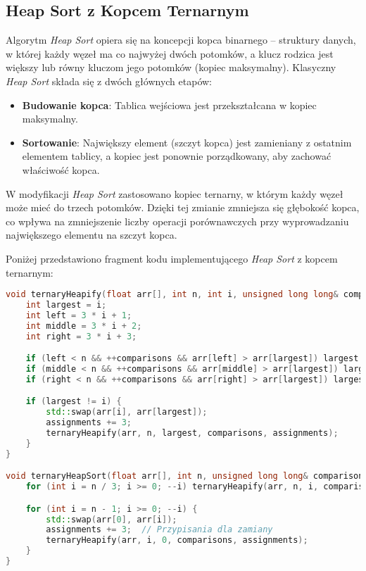\documentclass[a4paper,12pt]{article}
\begin{document}
\subsection{Heap Sort z Kopcem Ternarnym}
Algorytm \textit{Heap Sort} opiera się na koncepcji kopca binarnego – struktury danych, w której każdy węzeł ma co najwyżej dwóch potomków, a klucz rodzica jest większy lub równy kluczom jego potomków (kopiec maksymalny). Klasyczny \textit{Heap Sort} składa się z dwóch głównych etapów:
\begin{itemize}
    \item \textbf{Budowanie kopca}: Tablica wejściowa jest przekształcana w kopiec maksymalny.
    \item \textbf{Sortowanie}: Największy element (szczyt kopca) jest zamieniany z ostatnim elementem tablicy, a kopiec jest ponownie porządkowany, aby zachować właściwość kopca.
\end{itemize}

W modyfikacji \textit{Heap Sort} zastosowano kopiec ternarny, w którym każdy węzeł może mieć do trzech potomków. Dzięki tej zmianie zmniejsza się głębokość kopca, co wpływa na zmniejszenie liczby operacji porównawczych przy wyprowadzaniu największego elementu na szczyt kopca. 

\newpage
Poniżej przedstawiono fragment kodu implementującego \textit{Heap Sort} z kopcem ternarnym:

\begin{lstlisting}[language=C++,caption=Heap Sort z kopcem ternarnym]
void ternaryHeapify(float arr[], int n, int i, unsigned long long& comparisons, unsigned long long& assignments) {
    int largest = i;
    int left = 3 * i + 1;
    int middle = 3 * i + 2;
    int right = 3 * i + 3;

    if (left < n && ++comparisons && arr[left] > arr[largest]) largest = left;
    if (middle < n && ++comparisons && arr[middle] > arr[largest]) largest = middle;
    if (right < n && ++comparisons && arr[right] > arr[largest]) largest = right;

    if (largest != i) {
        std::swap(arr[i], arr[largest]);
        assignments += 3;
        ternaryHeapify(arr, n, largest, comparisons, assignments);
    }
}

void ternaryHeapSort(float arr[], int n, unsigned long long& comparisons, unsigned long long& assignments) {
    for (int i = n / 3; i >= 0; --i) ternaryHeapify(arr, n, i, comparisons, assignments);

    for (int i = n - 1; i >= 0; --i) {
        std::swap(arr[0], arr[i]);
        assignments += 3;  // Przypisania dla zamiany
        ternaryHeapify(arr, i, 0, comparisons, assignments);
    }
}
\end{lstlisting}
\newpage
\end{document}

